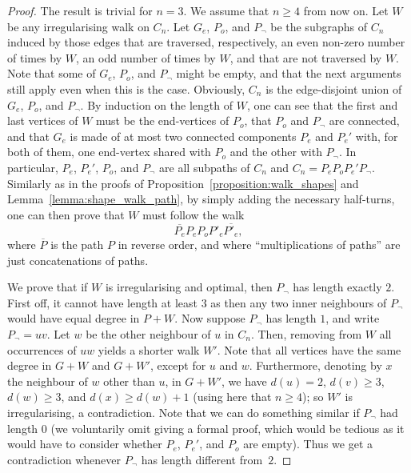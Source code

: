\documentclass[a4paper,11pt,dvipsnames]{elsarticle}
\begin{document}
\begin{proof}
The result is trivial for $n=3$. We assume that $n\ge 4$ from now on. Let $W$ be any irregularising walk on $C_n$. Let $G_e$, $P_o$, and $P_\neg$ be the subgraphs
of $C_n$ induced by those edges that are traversed, respectively, an even non-zero number of times by $W$, an odd number of times by $W$, and that are not traversed by $W$. Note that some of $G_e$, $P_o$, and $P_\neg$ might be empty, and that the next arguments still apply even when this is the case. Obviously, $C_n$ is the edge-disjoint
union of $G_e$, $P_o$, and $P_\neg$.
By induction on the length of $W$,
one can see that the first and last vertices of $W$ must be the end-vertices of $P_o$, that $P_o$ and $P_\neg$ are connected,
and that $G_e$ is made of at most two connected components $P_e$ and $P_e'$ with, for both of them, one end-vertex shared with $P_o$ and the other with $P_\neg$. In particular,
$P_e$, $P_e'$, $P_o$, and $P_\neg$ are all subpaths of $C_n$ and $C_n=P_eP_oP_e'P_\neg$. Similarly as in the proofs of Proposition~\ref{proposition:walk_shapes} and Lemma~\ref{lemma:shape_walk_path},
by simply adding the necessary half-turns, one can then prove that $W$ must follow the walk
\[
    \overline{P_e}P_eP_oP'_e\overline{P'_e},
\]
where $\overline{P}$ is the path $P$ in reverse order, and where ``multiplications of paths'' are just concatenations of paths.

We prove that if $W$ is irregularising and optimal, then $P_\neg$ has length exactly $2$. First off, it cannot
have length at least $3$ as then any two inner neighbours of $P_\neg$ would have equal degree in $P+W$.
Now suppose $P_{\neg}$ has length $1$, and write $P_{\neg} = uv$. Let $w$ be the other neighbour of $u$ in $C_n$. Then, removing from $W$ all occurrences of $uw$ yields a shorter walk $W'$. Note that all vertices have the same degree in $G+W$ and $G+W'$, except for $u$ and $w$. Furthermore, denoting by $x$ the neighbour of $w$ other than $u$, in $G+W'$, we have $d(u) = 2$, $d(v) \geq 3$, $d(w) \geq 3$, and $d(x) \geq d(w)+1$ (using here that $n \geq 4$); so $W'$ is irregularising, a contradiction.
Note that we can do something similar if $P_\neg$ had length $0$ (we voluntarily omit giving a formal proof, which would be tedious as it would have to consider whether $P_e$, $P_e'$, and $P_o$ are empty). Thus we get a contradiction whenever $P_{\neg}$ has length different from~$2$.








\end{proof}
\end{document}
